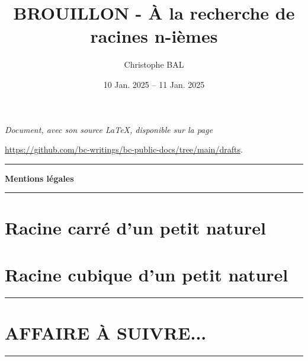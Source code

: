 \documentclass[12pt]{amsart}
\newcommand\contentdir{\jobname}
\begin{document}
\title{BROUILLON - À la recherche de racines n-ièmes}
\author{Christophe BAL}
\date{10 Jan. 2025 -- 11 Jan. 2025}

\maketitle

\begin{center}
	\itshape
	Document, avec son source \LaTeX, disponible sur la page

	\url{https://github.com/bc-writings/bc-public-docs/tree/main/drafts}.
\end{center}


\bigskip


\begin{center}
	\hrule\vspace{.3em}
	{
		\fontsize{1.35em}{1em}\selectfont
		\textbf{Mentions \og légales \fg}
	}

	\vspace{0.45em}
	\doclicenseThis
	\hrule
\end{center}


\setcounter{tocdepth}{2}
\tableofcontents


\newpage
\section{Racine carré d'un petit naturel}




\section{Racine cubique d'un petit naturel}




\bigskip

\hrule

\section{AFFAIRE À SUIVRE...}

\bigskip

\hrule
\end{document}
